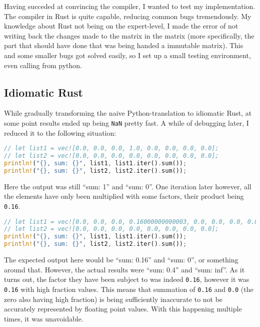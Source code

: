 

Having succeded at convincing the compiler, I wanted to test my implementation.
The compiler in Rust is quite capable, reducing common bugs tremendously.
My knowledge about Rust not being on the expert-level, I made the error of not
writing back the changes made to the matrix in the matrix (more specifically,
the part that should have done that was being handed a immutable matrix). This
and some smaller bugs got solved easily, so I set up a small testing
environment, even calling from python.


\subsection{Idiomatic Rust}


While gradually transforming the naive Python-translation to idiomatic Rust, at
some point results ended up being \verb|NaN| pretty fast. A while of
debugging later, I reduced it to the following situation:


\vline
\begin{lstlisting}[language=Rust]
// let list1 = vec![0.0, 0.0, 0.0, 1.0, 0.0, 0.0, 0.0, 0.0];
// let list2 = vec![0.0, 0.0, 0.0, 0.0, 0.0, 0.0, 0.0, 0.0];
println!("{}, sum: {}", list1, list1.iter().sum());
println!("{}, sum: {}", list2, list2.iter().sum());
\end{lstlisting}
\vline

Here the output was still ``sum: 1'' and ``sum: 0''. One iteration later however, all the elements have only been multiplied with some factors, their product being \verb|0.16|.

\vline
\begin{lstlisting}[language=Rust]
// let list1 = vec![0.0, 0.0, 0.0, 0.16000000000003, 0.0, 0.0, 0.0, 0.0];
// let list2 = vec![0.0, 0.0, 0.0, 0.0, 0.0, 0.0, 0.0, 0.0];
println!("{}, sum: {}", list1, list1.iter().sum());
println!("{}, sum: {}", list2, list2.iter().sum());
\end{lstlisting}
\vline

The expected output here would be ``sum: 0.16'' and ``sum: 0'', or something
around that. However, the actual results were ``sum: 0.4'' and ``sum: inf''. As
it turns out, the factor they have been subject to was indeed \verb|0.16|,
however it was \verb|0.16| with high fraction values. This means that summation
of \verb|0.16| and \verb|0.0| (the zero also having high fraction) is being
sufficiently inaccurate to not be accurately represented by floating point
values. With this happening multiple times, it was unavoidable.

